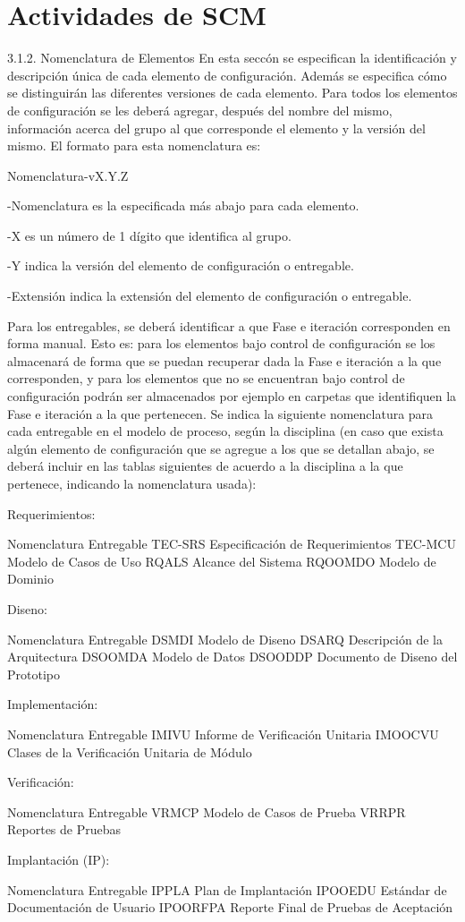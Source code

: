 
\chapter{Actividades de SCM}
\label{intro}
3.1.2.	Nomenclatura de Elementos
En esta secc\'on se especifican la identificaci\'on y descripci\'on \'unica de cada elemento de configuraci\'on.
Adem\'as se especifica c\'omo se distinguir\'an las diferentes versiones de cada elemento.
Para todos los elementos de configuraci\'on se les deber\'a agregar, despu\'es del nombre del mismo, informaci\'on acerca del grupo al que corresponde el elemento y la versi\'on del mismo.
El formato para esta nomenclatura es:


Nomenclatura-vX.Y.Z


-Nomenclatura es la especificada m\'as abajo para cada elemento.

-X es un n\'umero de 1 d\'igito que identifica al grupo.

-Y indica la versi\'on del elemento de configuraci\'on o entregable.

-Extensi\'on indica la extensi\'on del elemento de configuraci\'on o entregable.


Para los entregables, se deber\'a identificar a que Fase e iteraci\'on corresponden en forma manual. Esto es: para los elementos bajo control de configuraci\'on se los almacenar\'a de forma que se puedan recuperar dada la Fase e iteraci\'on a la que corresponden, y para los elementos que no se encuentran bajo control de configuraci\'on podr\'an ser almacenados por ejemplo en carpetas que identifiquen la Fase e iteraci\'on a la que pertenecen.
Se indica la siguiente nomenclatura para cada entregable en el modelo de proceso, seg\'un la disciplina (en caso que exista alg\'un elemento de configuraci\'on que se agregue a los que se detallan abajo, se deber\'a incluir en las tablas siguientes de acuerdo a la disciplina a la que pertenece, indicando la nomenclatura usada):

Requerimientos:

Nomenclatura	Entregable
TEC-SRS	Especificaci\'on de Requerimientos
TEC-MCU	Modelo de Casos de Uso
RQALS	Alcance del Sistema
RQOOMDO	Modelo de Dominio
	
Diseno:

Nomenclatura	Entregable
DSMDI	Modelo de Diseno
DSARQ	Descripci\'on de la Arquitectura
DSOOMDA	Modelo de Datos
DSOODDP	Documento de Diseno del Prototipo

Implementaci\'on:

Nomenclatura	Entregable
IMIVU	Informe de Verificaci\'on Unitaria
IMOOCVU	Clases de la Verificaci\'on Unitaria de M\'odulo

Verificaci\'on:

Nomenclatura	Entregable
VRMCP	Modelo de Casos de Prueba
VRRPR	Reportes de Pruebas

Implantaci\'on (IP):

Nomenclatura	Entregable
IPPLA	Plan de Implantaci\'on
IPOOEDU	Est\'andar de Documentaci\'on de Usuario
IPOORFPA	Reporte Final de Pruebas de Aceptaci\'on


\cleardoublepage
